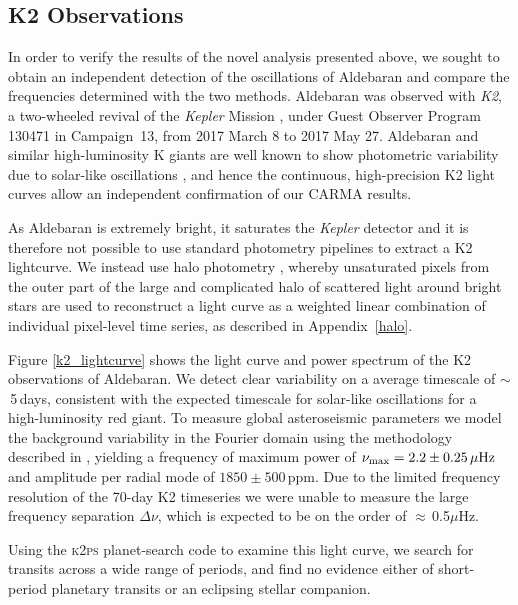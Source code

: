 \documentclass[modern]{aastex61}
\newcommand{\numax}{\mbox{$\nu_{\rm max}$}\xspace}
\newcommand{\Dnu}{\mbox{$\Delta \nu$}\xspace}
\newcommand{\muHz}{\mbox{$\mu$Hz}\xspace}
\newcommand{\kepler}{\emph{Kepler}\xspace}
\newcommand{\ktwo}{\emph{K2}\xspace}
\begin{document}
\subsection{K2 Observations}

In order to verify the results of the novel analysis presented above, we sought to obtain an independent detection of the oscillations of Aldebaran and compare the frequencies determined with the two methods.
Aldebaran was observed with \ktwo \citep{howell14}, a two-wheeled revival of the \kepler Mission \citep{2010sci...327..977b}, under Guest Observer Program 130471 in Campaign~13, from 2017 March 8 to 2017 May 27. Aldebaran and similar high-luminosity K giants are well known to show photometric variability due to solar-like oscillations \citep{bedding2000}, and hence the continuous, high-precision K2 light curves allow an independent confirmation of our CARMA results.

As Aldebaran is extremely bright, it saturates the \kepler detector and it is therefore not possible to use standard photometry pipelines to extract a K2 lightcurve. We instead use halo photometry \citep{White2017}, whereby unsaturated pixels from the outer part of the large and complicated halo of scattered light around bright stars are used to reconstruct a light curve as a weighted linear combination of individual pixel-level time series, as described in Appendix~\ref{halo}.

Figure \ref{k2_lightcurve} shows the light curve and power spectrum of the K2 observations of Aldebaran. We detect clear variability on a average timescale of $\sim$\,5\,days, consistent with the expected timescale for solar-like oscillations for a high-luminosity red giant. To measure global asteroseismic parameters we model the background variability in the Fourier domain using the methodology described in \citet{huber09}, yielding a frequency of maximum power of $\numax = 2.2 \pm 0.25\,\muHz$ and amplitude per radial mode of $1850 \pm 500$\,ppm. Due to the limited frequency resolution of the 70-day K2 timeseries we were unable to measure the large frequency separation \Dnu, which is expected to be on the order of $\approx$\,0.5\muHz.

Using the \textsc{k2ps} planet-search code \citep{k2ps,Pope2016} to examine this light curve, we search for transits across a wide range of periods, and find no evidence either of short-period planetary transits or an eclipsing stellar companion.
\end{document}
